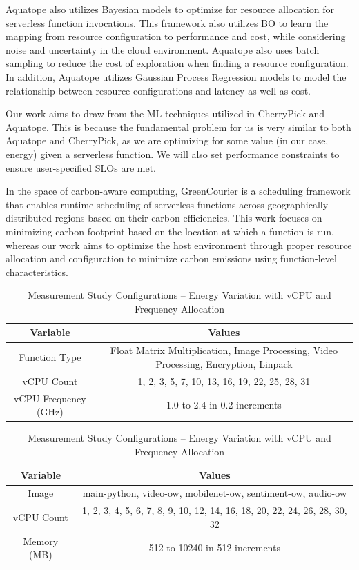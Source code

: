 \documentclass[times, 10pt,twocolumn]{article}
\begin{document}
Aquatope \cite{aquatope} also utilizes Bayesian models to optimize for resource allocation for serverless function invocations. This framework also utilizes BO to learn the mapping from resource configuration to performance and cost, while considering noise and uncertainty in the cloud environment. Aquatope also uses batch sampling to reduce the cost of exploration when finding a resource configuration. In addition, Aquatope utilizes Gaussian Process Regression models to model the relationship between resource configurations and latency as well as cost.

Our work aims to draw from the ML techniques utilized in CherryPick and Aquatope. This is because the fundamental problem for us is very similar to both Aquatope and CherryPick, as we are optimizing for some value (in our case, energy) given a serverless function. We will also set performance constraints to ensure user-specified SLOs are met.

In the space of carbon-aware computing, GreenCourier \cite{GreenCourier} is a scheduling framework that enables runtime scheduling of serverless functions across geographically distributed regions based on their carbon efficiencies. This work focuses on minimizing carbon footprint based on the location at which a function is run, whereas our work aims to optimize the host environment through proper resource allocation and configuration to minimize carbon emissions using function-level characteristics.

\begin{table}[htbp]
   \centering
   \begin{tabular}{|c|c|}
   \hline
   \textbf{Variable} & \textbf{Values} \\ \hline
   Function Type & Float Matrix Multiplication, Image Processing, Video Processing, Encryption, Linpack \\ \hline
   vCPU Count & 1, 2, 3, 5, 7, 10, 13, 16, 19, 22, 25, 28, 31 \\ \hline
   vCPU Frequency (GHz) & 1.0 to 2.4 in 0.2 increments\\ \hline
   \end{tabular}
   \caption{Measurement Study Configurations -- Energy Variation with vCPU and Frequency Allocation}
   \label{tab:mstudy1_configurations}
\end{table}

\begin{table}[htbp]
  \centering
  \begin{tabular}{|c|c|}
  \hline
  \textbf{Variable} & \textbf{Values} \\ \hline
  Image & main-python, video-ow, mobilenet-ow, sentiment-ow, audio-ow \\ \hline
  vCPU Count & 1, 2, 3, 4, 5, 6, 7, 8, 9, 10, 12, 14, 16, 18, 20, 22, 24, 26, 28, 30, 32 \\ \hline
  Memory (MB) & 512 to 10240 in 512 increments\\ \hline
  \end{tabular}
  \caption{Measurement Study Configurations -- Energy Variation with vCPU and Frequency Allocation}
  \label{tab:mstudy1_configurations}
\end{table}
\end{document}
